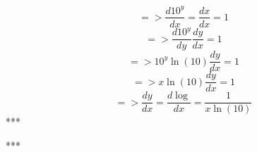 	\begin{displaymath}
	=>\frac{d10^y}{dx} = \frac{dx}{dx} = 1
	\end{displaymath}
	\begin{displaymath}
	=> \frac{d10^y}{dy}\frac{dy}{dx} = 1
	\end{displaymath}
	\begin{displaymath}
	=> 10^y \ln (10) \frac{dy}{dx} = 1
	\end{displaymath}
	\begin{displaymath}
	=>x \ln (10)\frac{dy}{dx} = 1
	\end{displaymath}
	\begin{displaymath}
	=> \frac{dy}{dx} = \frac{d\log}{dx} = \frac{1}{x\ln(10)}
	\end{displaymath}
	\newline
	***
	
	***
	

